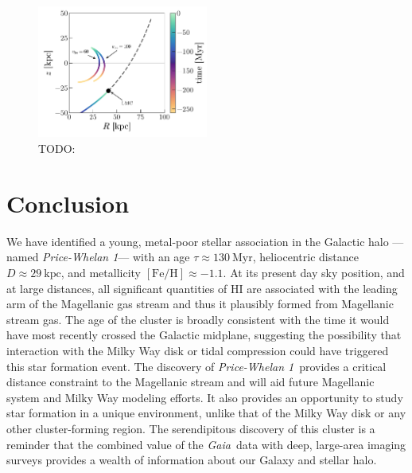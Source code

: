 \documentclass[twocolumn]{aastex62}
\newcommand{\gaia}{\textsl{Gaia}}
\newcommand{\feh}{\ensuremath{[\textrm{Fe} / \textrm{H}]}}
\newcommand{\hi}{H{\footnotesize I} }
\newcommand{\clustername}{\textsl{Price-Whelan 1}}
\newcommand{\clage}{\ensuremath{130~\textrm{Myr}}}
\newcommand{\clfeh}{\ensuremath{-1.1}}
\newcommand{\cldist}{\ensuremath{29~\textrm{kpc}}}
\begin{document}
\begin{figure}
\centering
\includegraphics[width=0.5\textwidth]{figures/orbits.pdf}
\caption{TODO:}
\label{fig:orbits}
\end{figure}

%
%
%
%


\section{Conclusion} \label{sec:conclusion}

We have identified a young, metal-poor stellar association in the Galactic halo --- named \clustername --- with an age $\tau \approx \clage$, heliocentric distance $D \approx \cldist$, and metallicity $\feh \approx \clfeh$.
At its present day sky position, and at large distances, all significant quantities of \hi are associated with the leading arm of the Magellanic gas stream and thus it plausibly formed from Magellanic stream gas.
The age of the cluster is broadly consistent with the time it would have most recently crossed the Galactic midplane, suggesting the possibility that interaction with the Milky Way disk or tidal compression could have triggered this star formation event.
The discovery of \clustername\ provides a critical distance constraint to the Magellanic stream and will aid future Magellanic system and Milky Way modeling efforts.
It also provides an opportunity to study star formation in a unique environment, unlike that of the Milky Way disk or any other cluster-forming region.
The serendipitous discovery of this cluster is a reminder that the combined value of the \gaia\ data with deep, large-area imaging surveys provides a wealth of information about our Galaxy and stellar halo.
\end{document}
